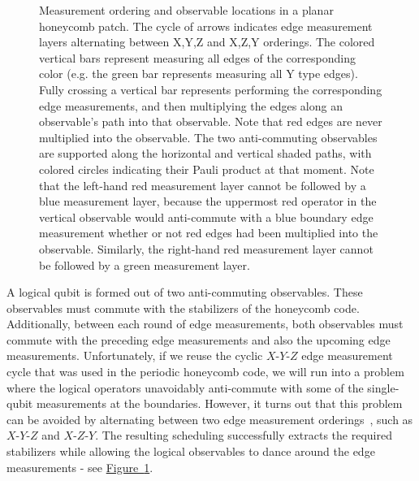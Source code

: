 \documentclass[onecolumn,unpublished,a4paper]{quantumarticle}
\theoremstyle{definition}
\theoremstyle{definition}
\theoremstyle{definition}
\newcommand{\fig}[1]{\hyperref[fig:#1]{Figure~\ref*{fig:#1}}}
\begin{document}
\begin{figure}[ht!]
    \centering
    \caption{
    Measurement ordering and observable locations in a planar honeycomb patch.
    The cycle of arrows indicates edge measurement layers alternating between X,Y,Z and X,Z,Y orderings.
    The colored vertical bars represent measuring all edges of the corresponding color (e.g. the green bar represents measuring all Y type edges).
    Fully crossing a vertical bar represents performing the corresponding edge measurements, and then multiplying the edges along an observable's path into that observable.  
    Note that red edges are never multiplied into the observable.
    The two anti-commuting observables are supported along the horizontal and vertical shaded paths, with colored circles indicating their Pauli product at that moment. 
    Note that the left-hand red measurement layer cannot be followed by a blue measurement layer, because the uppermost red operator in the vertical observable would anti-commute with a blue boundary edge measurement whether or not red edges had been multiplied into the observable.
    Similarly, the right-hand red measurement layer cannot be followed by a green measurement layer.
    }
    \label{fig:two_round_cycle}
\end{figure}

A logical qubit is formed out of two anti-commuting observables.
These observables must commute with the stabilizers of the honeycomb code.
Additionally, between each round of edge measurements, both observables must commute with the preceding edge measurements and also the upcoming edge measurements.
Unfortunately, if we reuse the cyclic $X$-$Y$-$Z$ edge measurement cycle that was used in the periodic honeycomb code, we will run into a problem where the logical operators unavoidably anti-commute with some of the single-qubit measurements at the boundaries.
However, it turns out that this problem can be avoided by alternating between two edge measurement orderings~\cite{hastings2021dynamically}, such as $X$-$Y$-$Z$ and $X$-$Z$-$Y$.
The resulting scheduling successfully extracts the required stabilizers while allowing the logical observables to dance around the edge measurements - see \fig{two_round_cycle}.
\end{document}
